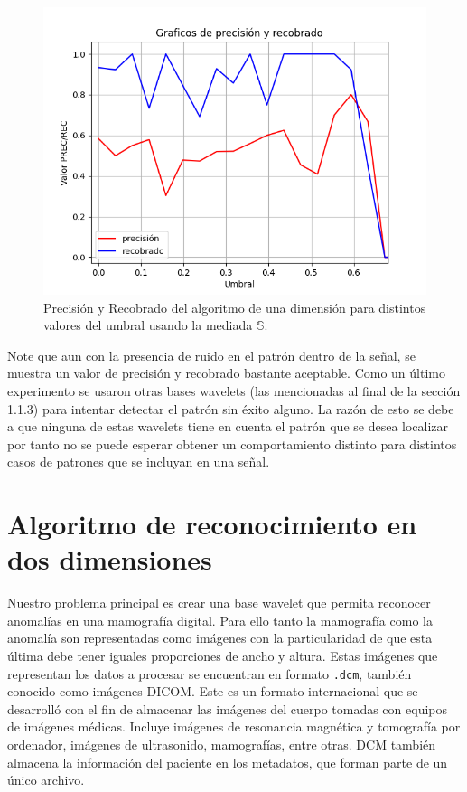 \begin{figure}[h]
\center
\includegraphics[scale=.45]{Graphics/PrecRec1D.png}
\caption{Precisi\'on y Recobrado del algoritmo de una dimensi\'on para distintos valores del umbral usando la mediada $\mathbb{S}$.}
\end{figure}

\par Note que aun con la presencia de ruido en el patr\'on dentro de la se\~nal, se muestra un valor de precisi\'on y recobrado bastante aceptable. Como un \'ultimo experimento se usaron otras bases wavelets (las mencionadas al final de la secci\'on 1.1.3) para intentar detectar el patr\'on sin \'exito alguno. La raz\'on de esto se debe a que ninguna de estas wavelets tiene en cuenta el patr\'on que se desea localizar por tanto no se puede esperar obtener un comportamiento distinto para distintos casos de patrones que se incluyan en una se\~nal.

\section{Algoritmo de reconocimiento en dos dimensiones}

\par Nuestro problema principal es crear una base wavelet que permita reconocer anomal\'ias en una mamograf\'ia digital. Para ello tanto la mamograf\'ia como la anomal\'ia son representadas como im\'agenes con la particularidad de que esta \'ultima debe tener iguales proporciones de ancho y altura. Estas im\'agenes que representan los datos a procesar se encuentran en formato \texttt{.dcm}, tambi\'en conocido como im\'agenes DICOM. Este es un formato internacional que se desarrolló con el fin de almacenar las imágenes del cuerpo tomadas con equipos de imágenes médicas. Incluye imágenes de resonancia magnética y tomografía por ordenador, imágenes de ultrasonido, mamograf\'ias, entre otras. DCM también almacena la información del paciente en los metadatos, que forman parte de un único archivo.\\

